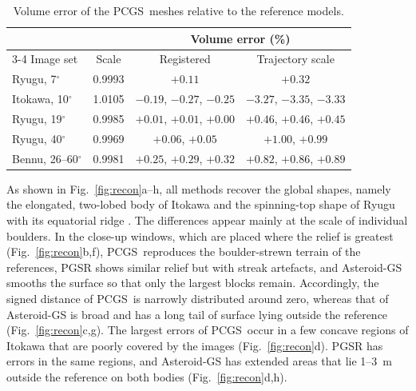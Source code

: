 \documentclass[fleqn,usenatbib]{aa}
\newcommand{\pcgs}{PCGS}
\begin{document}


\begin{table}
\caption{Volume error of the \pcgs\ meshes relative to the reference models.}
\label{tab:volume}
\centering
\footnotesize\setlength{\tabcolsep}{4pt}
\begin{tabular}{@{}lccc@{}}
\toprule
 & & \multicolumn{2}{c}{Volume error (\%)} \\
\cmidrule(lr){3-4}
Image set & Scale & Registered & Trajectory scale \\
\midrule
Ryugu, 7$^\circ$  & 0.9993 & $+0.11$ & $+0.32$ \\
Itokawa, 10$^\circ$ & 1.0105 & $-0.19$, $-0.27$, $-0.25$ & $-3.27$, $-3.35$, $-3.33$ \\
Ryugu, 19$^\circ$ & 0.9985 & $+0.01$, $+0.01$, $+0.00$ & $+0.46$, $+0.46$, $+0.45$ \\
Ryugu, 40$^\circ$ & 0.9969 & $+0.06$, $+0.05$ & $+1.00$, $+0.99$ \\
Bennu, 26--60$^\circ$ & 0.9981 & $+0.25$, $+0.29$, $+0.32$ & $+0.82$, $+0.86$, $+0.89$ \\
\bottomrule
\end{tabular}
\end{table}

As shown in Fig.~\ref{fig:recon}a--h, all methods recover the global shapes, namely the elongated, two-lobed body of
Itokawa and the spinning-top shape of Ryugu with its equatorial ridge \citep{Watanabe2019,Sugita2019}. The differences
appear mainly at the scale of individual boulders. In the close-up windows, which are placed where the relief is greatest (Fig.~\ref{fig:recon}b,f), \pcgs\
reproduces the boulder-strewn terrain of the references, PGSR shows similar relief but with streak artefacts, and
Asteroid-GS smooths the surface so that only the largest blocks remain. Accordingly, the signed distance of \pcgs\ is
narrowly distributed around zero, whereas that of Asteroid-GS is broad and has a long tail of surface lying outside the
reference (Fig.~\ref{fig:recon}c,g). The largest errors of \pcgs\ occur in a few concave regions of Itokawa that are
poorly covered by the images (Fig.~\ref{fig:recon}d). PGSR has errors in the same regions, and Asteroid-GS has extended
areas that lie 1--3~m outside the reference on both bodies (Fig.~\ref{fig:recon}d,h).
\end{document}
